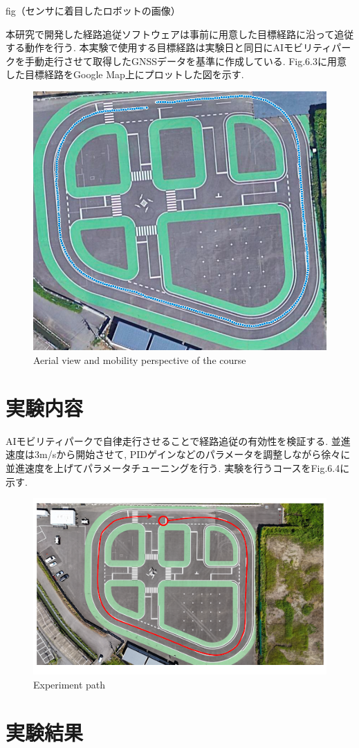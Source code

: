 fig（センサに着目したロボットの画像）

本研究で開発した経路追従ソフトウェアは事前に用意した目標経路に沿って追従する動作を行う.
本実験で使用する目標経路は実験日と同日にAIモビリティパークを手動走行させて取得したGNSSデータを基準に作成している.
Fig.6.3に用意した目標経路をGoogle Map上にプロットした図を示す.

\begin{figure}[H]
  \centering
 \includegraphics[keepaspectratio, scale=0.3]
      {images/targetpath.png}
 \caption{Aerial view and mobility perspective of the course}
 \label{fig:course}
\end{figure}

\section{実験内容}
AIモビリティパークで自律走行させることで経路追従の有効性を検証する.
並進速度は3m/sから開始させて, PIDゲインなどのパラメータを調整しながら徐々に並進速度を上げてパラメータチューニングを行う.
実験を行うコースをFig.6.4に示す.

\begin{figure}[H]
  \centering
 \includegraphics[keepaspectratio, scale=0.5]
      {images/AIFormulapath.png}
 \caption{Experiment path}
 \label{fig:path}
\end{figure}

\section{実験結果}